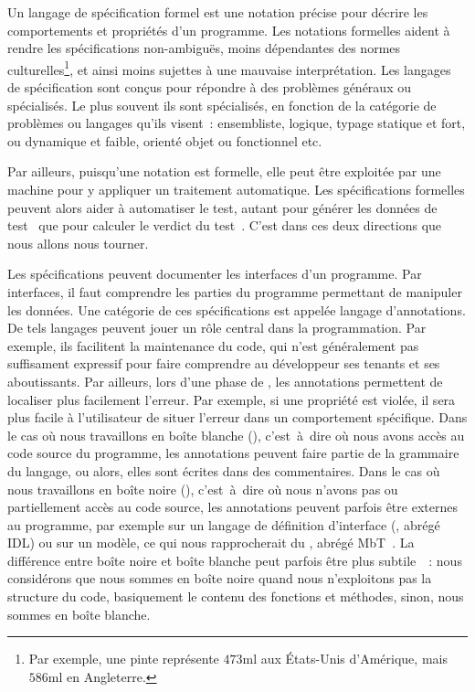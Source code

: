 Un {\strong langage de spécification} formel est une notation précise pour
décrire les comportements et propriétés d'un programme. Les {\strong notations
formelles} aident à rendre les spécifications non-ambiguës, moins dépendantes
des normes culturelles\footnote{Par exemple, une pinte représente $473$ml aux
États-Unis d'Amérique, mais $586$ml en Angleterre.}, et ainsi moins sujettes à
une mauvaise interprétation. Les langages de spécification sont conçus pour
répondre à des problèmes généraux ou spécialisés. Le plus souvent ils sont
spécialisés, en fonction de la catégorie de problèmes ou langages qu'ils
visent~: ensembliste, logique, typage statique et fort, ou dynamique et faible,
orienté objet ou fonctionnel etc.

Par ailleurs, puisqu'une notation est formelle, elle peut être exploitée par une
machine pour y appliquer un traitement automatique. Les spécifications formelles
peuvent alors aider à {\strong automatiser le test}, autant pour générer les
données de test~ que pour
calculer le verdict du test~. C'est dans ces deux directions que
nous allons nous tourner.

Les spécifications peuvent documenter les {\strong interfaces} d'un programme.
Par interfaces, il faut comprendre les parties du programme permettant de
manipuler les données. Une catégorie de ces spécifications est appelée {\strong
langage d'annotations}. De tels langages peuvent jouer un rôle central dans la
programmation. Par exemple, ils facilitent la maintenance du code, qui n'est
généralement pas suffisament expressif pour faire comprendre au développeur ses
tenants et ses aboutissants. Par ailleurs, lors d'une phase de
, les annotations permettent de localiser plus facilement
l'erreur. Par exemple, si une propriété est violée, il sera plus facile à
l'utilisateur de situer l'erreur dans un comportement spécifique. Dans le cas où
nous travaillons en {\strong boîte blanche} (),
c'est~à~dire où nous avons accès au code source du programme, les annotations
peuvent faire partie de la grammaire du langage, ou alors, elles sont écrites
dans des commentaires. Dans le cas où nous travaillons en {\strong boîte noire}
(), c'est~à~dire où nous n'avons pas ou partiellement accès
au code source, les annotations peuvent parfois être externes au programme, par
exemple sur un langage de définition d'interface (, abrégé IDL) ou sur un modèle, ce qui nous rapprocherait du
, abrégé MbT~. La différence
entre boîte noire et boîte blanche peut parfois être plus
subtile~~: nous considérons que nous sommes en boîte noire quand
nous n'exploitons pas la structure du code, basiquement le contenu des fonctions
et méthodes, sinon, nous sommes en boîte blanche.

